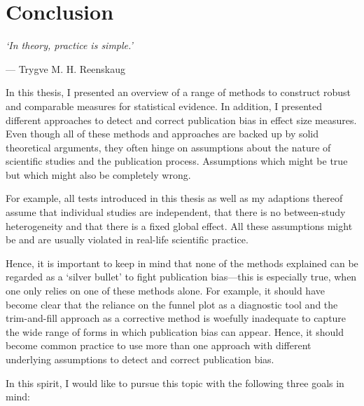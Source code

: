 \chapter{Conclusion}
\label{cha:conclusion_and_limitations}
\epigraph{\centering \textit{`In theory, practice is simple.'}}{--- Trygve M. H. Reenskaug}%
In this thesis, I presented an overview of a range of methods to construct robust and comparable measures for statistical evidence. In addition, I presented different approaches to detect and correct publication bias in effect size measures. Even though all of these methods and approaches are backed up by solid theoretical arguments, they often hinge on assumptions about the nature of scientific studies and the publication process. Assumptions which might be true but which might also be completely wrong.\par
For example, all tests introduced in this thesis as well as my adaptions thereof assume that individual studies are independent, that there is no between-study heterogeneity and that there is a fixed global effect. All these assumptions might be and are usually violated in real-life scientific practice.\par
Hence, it is important to keep in mind that none of the methods explained can be regarded as a `silver bullet' to fight publication bias---this is especially true, when one only relies on one of these methods alone. For example, it should have become clear that the reliance on the funnel plot as a diagnostic tool and the trim-and-fill approach as a corrective method is woefully inadequate to capture the wide range of forms in which publication bias can appear. Hence, it should become common practice to use more than one approach with different underlying assumptions to detect and correct publication bias.\par
In this spirit, I would like to pursue this topic with the following three goals in mind:
